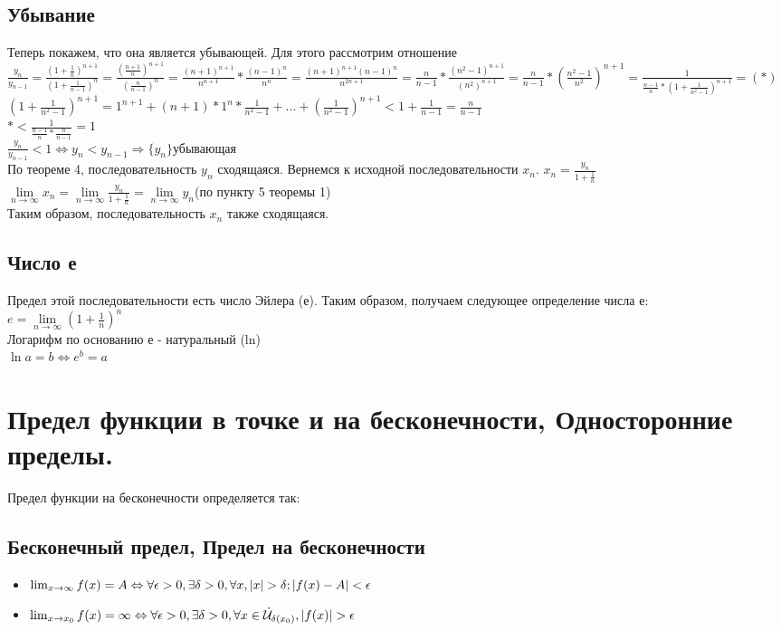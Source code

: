 \documentclass[oneside]{book}
\begin{document}
\section{Убывание}
Теперь покажем, что она является убывающей. Для этого рассмотрим отношение
$\frac{y_n}{y_{n-1}}=\frac{(1+\frac{1}{n})^{n+1}}{(1+\frac{1}{n-1})^n}=\frac{(\frac{n+1}{n})^{n+1}}{(\frac{n}{n-1})^n}=\frac{(n+1)^{n+1}}{n^{n+1}}*\frac{(n-1)^n}{n^n}=\frac{(n+1)^{n+1}(n-1)^{n}}{n^{2n+1}}=\frac{n}{n-1}*\frac{(n^2-1)^{n+1}}{(n^2)^{n+1}}=\frac{n}{n-1}*(\frac{n^2-1}{n^2})^{n+1}=\frac{1}{\frac{n-1}{n}*(1+\frac{1}{n^2-1})^{n+1}}=(*)$\\
$(1+\frac{1}{n^2-1})^{n+1}=1^{n+1}+(n+1)*1^n*\frac{1}{n^2-1}+...+(\frac{1}{n^2-1})^{n+1}<1+\frac{1}{n-1}=\frac{n}{n-1}$\\
$*<\frac{1}{\frac{n-1}{n}*\frac{n}{n-1}}=1$
\\$\frac{y_n}{y_{n-1}}<1\Leftrightarrow y_n<y_{n-1} \Rightarrow \{y_n\} $убывающая
\\По теореме 4, последовательность $y_n$ сходящаяся. Вернемся к исходной последовательности $x_n$.
$x_n=\frac{y_n}{1+\frac{1}{n}}$\\
$\lim \limits_{n\rightarrow \infty}x_n=\lim \limits_{n\rightarrow \infty}\frac{y_n}{1+\frac{1}{n}}=\lim \limits_{n\rightarrow \infty}y_n$(по пункту 5 теоремы 1)\\
Таким образом, последовательность $x_n$ также сходящаяся.
\section{Число е}
Предел этой последовательности есть число Эйлера (е).
Таким образом, получаем следующее определение числа е:\\
$e=\lim \limits_{n\rightarrow \infty}(1+\frac{1}{n})^n$
\\Логарифм по основанию е - натуральный (ln)\\
$\ln a = b \Leftrightarrow e^b=a$

\setcounter{chapter}{8}
\chapter{Предел функции в точке и на бесконечности, Односторонние пределы.}

Предел функции на бесконечности определяется так:
\section{Бесконечный предел, Предел на бесконечности}
\begin{itemize}
	\item $\lim_{x \rightarrow \infty}{f(x)} = A \Leftrightarrow \\ \forall \epsilon > 0, \exists \delta > 0,
	\forall x, |x| > \delta; |f(x) - A| < \epsilon$
	\item $\lim_{x \rightarrow x_0}{f(x)} = \infty \Leftrightarrow \\ \forall \epsilon > 0, \exists \delta > 0,
	\forall x \in \dot{\mathcal{U}}_{\delta(x_0)}, |f(x)| > \epsilon$
\end{itemize}
\end{document}

